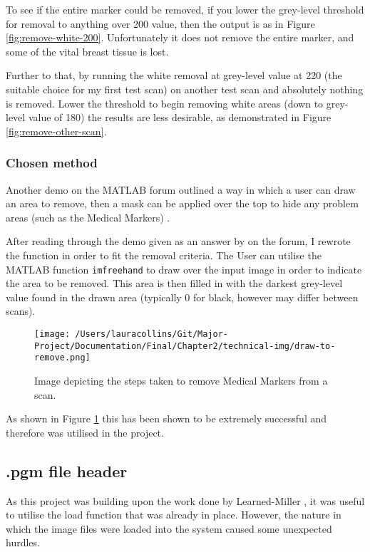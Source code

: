 To see if the entire marker could be removed, if you lower the grey-level threshold for removal to anything over 200 value, then the output is as in Figure \ref{fig:remove-white-200}. Unfortunately it does not remove the entire marker, and some of the vital breast tissue is lost.

Further to that, by running the white removal at grey-level value at 220 (the suitable choice for my first test scan) on another test scan and absolutely nothing is removed. Lower the threshold to begin removing white areas (down to grey-level value of 180) the results are less desirable, as demonstrated in Figure \ref{fig:remove-other-scan}.

\subsubsection{Chosen method}

Another demo on the MATLAB forum outlined a way in which a user can draw an area to remove, then a mask can be applied over the top to hide any problem areas (such as the Medical Markers) \cite{binary_mask}.

After reading through the demo given as an answer by  on the forum, I rewrote the function in order to fit the removal criteria. The User can utilise the MATLAB function \texttt{imfreehand} \cite{imfreehand} to draw over the input image in order to indicate the area to be removed. This area is then filled in with the darkest grey-level value found in the drawn area (typically 0 for black, however may differ between scans).

\begin{figure}[H]
  \centering
  \texttt{[image: /Users/lauracollins/Git/Major-Project/Documentation/Final/Chapter2/technical-img/draw-to-remove.png]}
  \caption{Image depicting the steps taken to remove Medical Markers from a scan.}
  \label{fig:remove-marker}
\end{figure}

As shown in Figure \ref{fig:remove-marker} this has been shown to be extremely successful and therefore was utilised in the project.

\subsection{.pgm file header}

As this project was building upon the work done by Learned-Miller \cite{joint-alignment}, it was useful to utilise the load function that was already in place. However, the nature in which the image files were loaded into the system caused some unexpected hurdles.

